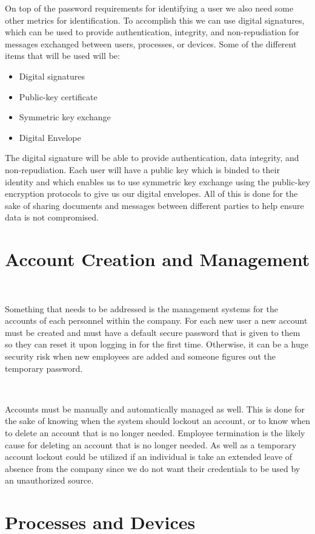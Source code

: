 \documentclass[12pt,a4paper]{report}
\begin{document}
On top of the password requirements for identifying a user we also need some other metrics for identification. 
To accomplish this we can use digital signatures, which can be used to provide authentication, integrity, and non-repudiation for messages exchanged between users, processes, or devices.
Some of the different items that will be used will be:
\begin{itemize}
 \item Digital signatures
 \item Public-key certificate
 \item Symmetric key exchange
 \item Digital Envelope
\end{itemize}

The digital signature will be able to provide authentication, data integrity, and non-repudiation.
Each user will have a public key which is binded to their identity and which enables us to use symmetric key exchange using the public-key encryption protocols to give us our digital envelopes. 
All of this is done for the sake of sharing documents and messages between different parties to help ensure data is not compromised.

\section{Account Creation and Management}
\

Something that needs to be addressed is the management systems for the accounts of each personnel within the company.
For each new user a new account must be created and must have a default secure password that is given to them so they can reset it upon logging in for the first time. 
Otherwise, it can be a huge security risk when new employees are added and someone figures out the temporary password. 

\

Accounts must be manually and automatically managed as well.
This is done for the sake of knowing when the system should lockout an account, or to  know when to delete an account that is no longer needed.
Employee termination is the likely cause for deleting an account that is no longer needed.
As well as a temporary account lockout could be utilized if an individual is take an extended leave of absence from the company since we do not want their credentials to be used by an unauthorized source.

\section{Processes and Devices}
\
\end{document}
